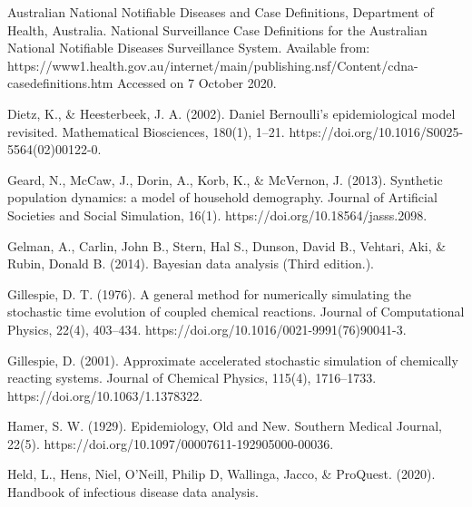 \begin{thebibliography}{99}
	 Australian National Notifiable Diseases and Case Definitions, Department of Health, Australia. National Surveillance Case Definitions for the Australian National Notifiable Diseases Surveillance System. Available from: https://www1.health.gov.au/internet/main/publishing.nsf/Content/cdna-casedefinitions.htm Accessed on 7 October 2020.
	
	
	 Dietz, K., \& Heesterbeek, J. A. (2002). Daniel Bernoulli’s epidemiological model revisited. Mathematical Biosciences, 180(1), 1–21. https://doi.org/10.1016/S0025-5564(02)00122-0.
	
	 Geard, N., McCaw, J., Dorin, A., Korb, K., \& McVernon, J. (2013). Synthetic population dynamics: a model of household demography. Journal of Artificial Societies and Social Simulation, 16(1). https://doi.org/10.18564/jasss.2098.
	
	 Gelman, A., Carlin, John B., Stern, Hal S., Dunson, David B., Vehtari, Aki, \& Rubin, Donald B. (2014). Bayesian data analysis (Third edition.).
	
	
	 Gillespie, D. T. (1976). A general method for numerically simulating the stochastic time evolution of coupled chemical reactions. Journal of Computational Physics, 22(4), 403–434. https://doi.org/10.1016/0021-9991(76)90041-3.
	
	 Gillespie, D. (2001). Approximate accelerated stochastic simulation of chemically reacting systems. Journal of Chemical Physics, 115(4), 1716–1733. https://doi.org/10.1063/1.1378322.
	
	 Hamer, S. W. (1929). Epidemiology, Old and New. Southern Medical Journal, 22(5). https://doi.org/10.1097/00007611-192905000-00036.
	
	 Held, L., Hens, Niel, O'Neill, Philip D, Wallinga, Jacco, \& ProQuest. (2020). Handbook of infectious disease data analysis.
	

\end{thebibliography}
